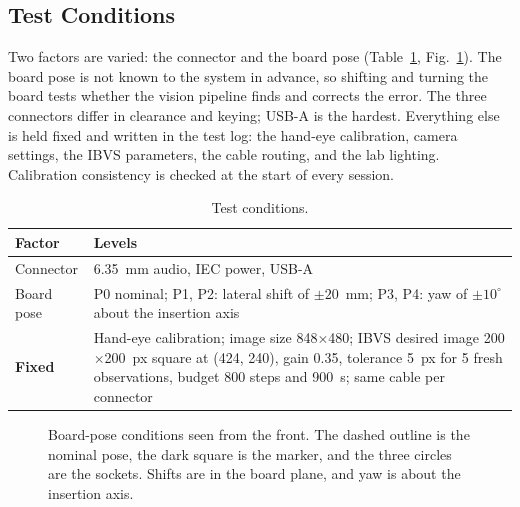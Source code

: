 \documentclass[11pt,conference]{IEEEtran}
\begin{document}
\subsection{Test Conditions}

Two factors are varied: the connector and the board pose (Table~\ref{tab:cond}, Fig.~\ref{fig:poses}). The board pose is not known to the system in advance, so shifting and turning the board tests whether the vision pipeline finds and corrects the error. The three connectors differ in clearance and keying; USB-A is the hardest. Everything else is held fixed and written in the test log: the hand-eye calibration, camera settings, the IBVS parameters, the cable routing, and the lab lighting. Calibration consistency is checked at the start of every session.

\begin{table}[H]
\caption{Test conditions.}
\label{tab:cond}
\centering
\small
\renewcommand{\arraystretch}{1.12}
\begin{tabular}{@{}p{1.75cm}p{5.9cm}@{}}
\toprule
\textbf{Factor} & \textbf{Levels}\\
\midrule
Connector & 6.35~mm audio, IEC power, USB-A\\
Board pose & P0 nominal; P1, P2: lateral shift of $\pm20$~mm; P3, P4: yaw of $\pm10^\circ$ about the insertion axis\\
\midrule
\textbf{Fixed} & Hand-eye calibration; image size 848$\times$480; IBVS desired image 200$\times$200~px square at (424, 240), gain 0.35, tolerance 5~px for 5 fresh observations, budget 800 steps and 900~s; same cable per connector\\
\bottomrule
\end{tabular}
\end{table}

\begin{figure}[H]
\centering
{}
\caption{Board-pose conditions seen from the front. The dashed outline is the nominal pose, the dark square is the marker, and the three circles are the sockets. Shifts are in the board plane, and yaw is about the insertion axis.}
\label{fig:poses}
\end{figure}
\end{document}
